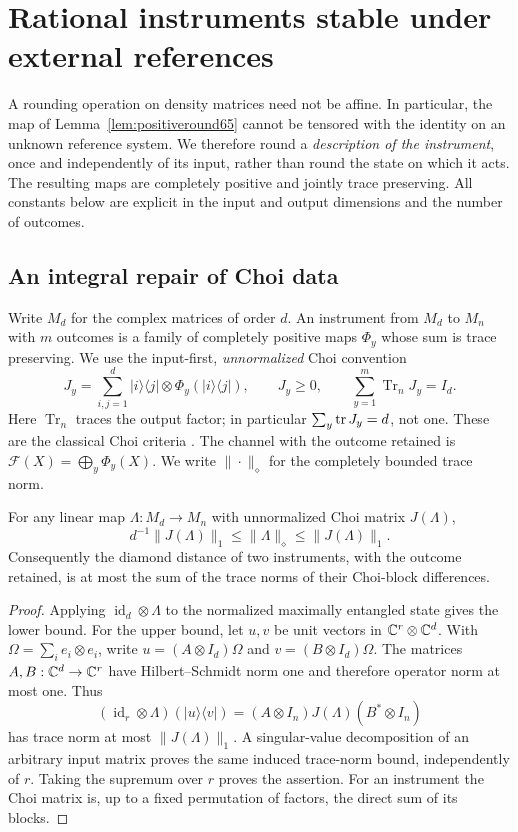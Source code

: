 \section{Rational instruments stable under external references}\label{sec:reference66}
A rounding operation on density matrices need not be affine. In
particular, the map of Lemma~\ref{lem:positiveround65} cannot be tensored
with the identity on an unknown reference system. We therefore round a
\emph{description of the instrument}, once and independently of its
input, rather than round the state on which it acts. The resulting
maps are completely positive and jointly trace preserving. All
constants below are explicit in the input and output dimensions and
the number of outcomes.

\subsection{An integral repair of Choi data}
Write $M_d$ for the complex matrices of order $d$. An instrument from
$M_d$ to $M_n$ with $m$ outcomes is a family of completely positive
maps $\Phi_y$ whose sum is trace preserving. We use the input-first,
\emph{unnormalized} Choi convention
\begin{equation}\label{eq:choiconvention66}
 J_y=\sum_{i,j=1}^d |i\rangle\langle j|\otimes
                     \Phi_y(|i\rangle\langle j|),\qquad
 J_y\ge0,\qquad \sum_{y=1}^m\operatorname{Tr}_{n}J_y=I_d.
\end{equation}
Here $\operatorname{Tr}_{n}$ traces the output factor; in particular
$\sum_y\operatorname{tr} J_y=d$, not one. These are the classical Choi criteria
\cite[Theorems~2.22 and~2.26]{Watrous65}. The channel with the outcome
retained is $\mathcal F(X)=\bigoplus_y\Phi_y(X)$. We write $\|\cdot\|_\diamond$
for the completely bounded trace norm.

\begin{lemma}\label{lem:choidiamond66}
For any linear map $\Lambda:M_d\to M_n$ with unnormalized Choi matrix
$J(\Lambda)$,
\[
 d^{-1}\|J(\Lambda)\|_1\le\|\Lambda\|_\diamond
                                      \le\|J(\Lambda)\|_1.
\]
Consequently the diamond distance of two instruments, with the outcome
retained, is at most the sum of the trace norms of their Choi-block
differences.
\end{lemma}
\begin{proof}
Applying $\operatorname{id}_d\otimes\Lambda$ to the normalized
maximally entangled state gives the lower bound. For the upper bound,
let $u,v$ be unit vectors in $\mathbb C^r\otimes\mathbb C^d$. With
$\Omega=\sum_i e_i\otimes e_i$, write
$u=(A\otimes I_d)\Omega$ and $v=(B\otimes I_d)\Omega$.
The matrices $A,B:\mathbb C^d\to\mathbb C^r$ have Hilbert--Schmidt norm one and
therefore operator norm at most one. Thus
\[
 (\operatorname{id}_r\otimes\Lambda)(|u\rangle\langle v|)
       =(A\otimes I_n)J(\Lambda)(B^*\otimes I_n)
\]
has trace norm at most $\|J(\Lambda)\|_1$. A singular-value
decomposition of an arbitrary input matrix proves the same induced
trace-norm bound, independently of $r$. Taking the supremum over $r$
proves the assertion. For an instrument the Choi matrix is, up to a
fixed permutation of factors, the direct sum of its blocks.
\end{proof}


